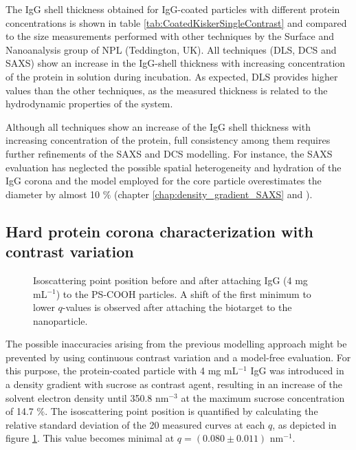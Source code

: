 The IgG shell thickness obtained for IgG-coated particles with different protein concentrations is shown in table \ref{tab:CoatedKiskerSingleContrast} and compared to the size measurements performed with other techniques by the Surface and Nanoanalysis group of NPL (Teddington, UK). All techniques (DLS, DCS and SAXS) show an increase in the IgG-shell thickness with increasing concentration of the protein in solution during incubation. As expected, DLS provides higher values than the other techniques, as the measured thickness is related to the hydrodynamic properties of the system.

Although all techniques show an increase of the IgG shell thickness with increasing concentration of the protein, full consistency among them requires further refinements of the SAXS and DCS modelling. For instance, the SAXS evaluation has neglected the possible spatial heterogeneity and hydration of the IgG corona and the model employed for the core particle overestimates the diameter by almost 10 $\%$ (chapter \ref{chap:density_gradient_SAXS} and \cite{minelli_characterization_2014}).

\subsection{Hard protein corona characterization with contrast variation}
\label{sec:coated_kisker_continuous}

\begin{figure}
	\centering
		
		\caption[Isoscattering point position before and after attaching IgG.]{Isoscattering point position before and after attaching IgG (4 mg mL$^{-1}$) to the PS-COOH particles. A shift of the first minimum to lower $q$-values is observed after attaching the biotarget to the nanoparticle.}
		\label{fig:CoatedKiskerIsopointComp}
\end{figure}

The possible inaccuracies arising from the previous modelling approach might be prevented by using continuous contrast variation and a model-free evaluation. For this purpose, the protein-coated particle with 4 mg mL$^{-1}$ IgG was introduced in a density gradient with sucrose as contrast agent, resulting in an increase of the solvent electron density until 350.8 nm$^{-3}$ at the maximum sucrose concentration of 14.7 $\%$. The isoscattering point position is quantified by calculating the relative standard deviation of the 20 measured curves at each $q$, as depicted in figure \ref{fig:CoatedKiskerIsopointComp}. This value becomes minimal at $q = \left( 0.080\pm0.011 \right)$ nm$^{-1}$.

